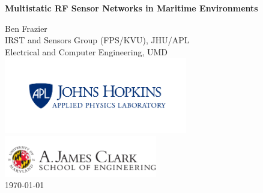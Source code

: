 \titlepage
\begin{center}
\vspace*{25pt}
{\huge \bfseries Multistatic RF Sensor Networks in Maritime Environments\\}

\vspace{100 pt}

\large Ben Frazier \\
 \small IRST and Sensors Group (FPS/KVU), JHU/APL \\
\small Electrical and Computer Engineering, UMD \\
\includegraphics[width=0.6\textwidth]{../media/apl_small_horizontal_blue} \\
\includegraphics[width=0.5\textwidth]{../media/clark}\\
\vspace{75pt}
\large \today
\end{center}